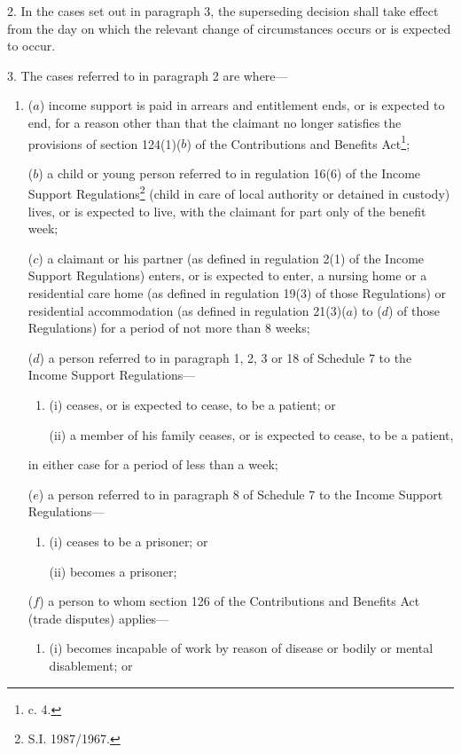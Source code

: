 \documentclass[12pt,a4paper]{article}
\begin{document}
\medskip

2.  In the cases set out in paragraph 3, the superseding decision shall take effect from the day on which the relevant change of circumstances occurs or is expected to occur.

\medskip

3.  The cases referred to in paragraph 2 are where—
\begin{enumerate}\item[]
($a$) income support is paid in arrears and entitlement ends, or is expected to end, for a reason other than that the claimant no longer satisfies the provisions of section 124(1)($b$)  of the Contributions and Benefits Act\footnote{ c. 4.};

($b$) a child or young person referred to in regulation 16(6) of the Income Support Regulations\footnote{\frenchspacing S.I. 1987/1967.} (child in care of local authority or detained in custody) lives, or is expected to live, with the claimant for part only of the benefit week;

($c$) a claimant or his partner (as defined in regulation 2(1) of the Income Support Regulations) enters, or is expected to enter, a nursing home or a residential care home (as defined in regulation 19(3) of those Regulations) or residential accommodation (as defined in regulation 21(3)($a$)  to ($d$)  of those Regulations) for a period of not more than 8 weeks;

($d$) a person referred to in paragraph 1, 2, 3 or 18 of Schedule 7 to the Income Support Regulations—
\begin{enumerate}\item[]
(i) ceases, or is expected to cease, to be a patient; or

(ii) a member of his family ceases, or is expected to cease, to be a patient,
\end{enumerate}
in either case for a period of less than a week;

($e$) a person referred to in paragraph 8 of Schedule 7 to the Income Support Regulations—
\begin{enumerate}\item[]
(i) ceases to be a prisoner; or

(ii) becomes a prisoner;
\end{enumerate}

($f$) a person to whom section 126 of the Contributions and Benefits Act (trade disputes) applies—
\begin{enumerate}\item[]
(i) becomes incapable of work by reason of disease or bodily or mental disablement; or


\end{enumerate}
\end{enumerate}
\end{document}
